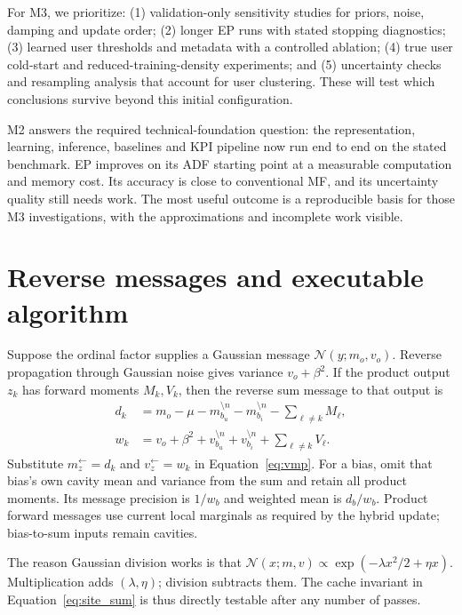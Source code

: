 \documentclass[11pt,a4paper]{article}
\newcommand{\N}{\mathcal N}
\begin{document}
For M3, we prioritize: (1) validation-only sensitivity studies for priors, noise,
damping and update order; (2) longer EP runs with stated stopping diagnostics;
(3) learned user thresholds and metadata with a controlled ablation; (4) true
user cold-start and reduced-training-density experiments; and (5) uncertainty
checks and resampling analysis that account for user clustering. These will
test which conclusions survive beyond this initial configuration.

M2 answers the required technical-foundation question: the representation,
learning, inference, baselines and KPI pipeline now run end to end on the stated
benchmark. EP improves on its ADF starting point at a measurable computation and
memory cost. Its accuracy is close to conventional MF, and its uncertainty
quality still needs work. The most useful outcome is a reproducible basis for
those M3 investigations, with the approximations and incomplete work visible.

\FloatBarrier



\appendix
\section{Reverse messages and executable algorithm}\label{app:derivation}
Suppose the ordinal factor supplies a Gaussian message
$\N(y;m_o,v_o)$. Reverse propagation through Gaussian noise gives variance
$v_o+\beta^2$. If the product output $z_k$ has forward moments $M_k,V_k$,
then the reverse sum message to that output is
\begin{align}
d_k &= m_o-\mu-m^{\setminus n}_{b_u}-m^{\setminus n}_{b_i}
                  -\sum_{\ell\ne k}M_\ell,\\
w_k &= v_o+\beta^2+v^{\setminus n}_{b_u}+v^{\setminus n}_{b_i}
                  +\sum_{\ell\ne k}V_\ell.
\end{align}
Substitute $m_z^{\leftarrow}=d_k$ and $v_z^{\leftarrow}=w_k$ in
Equation~\ref{eq:vmp}. For a bias, omit that bias's own cavity mean and variance
from the sum and retain all product moments. Its message precision is $1/w_b$
and weighted mean is $d_b/w_b$. Product forward messages use current local
marginals as required by the hybrid update; bias-to-sum inputs remain cavities.

The reason Gaussian division works is that
$\N(x;m,v)\propto\exp(-\lambda x^2/2+\eta x)$. Multiplication adds
$(\lambda,\eta)$; division subtracts them. The cache invariant in
Equation~\ref{eq:site_sum} is thus directly testable after any number of passes.
\end{document}
